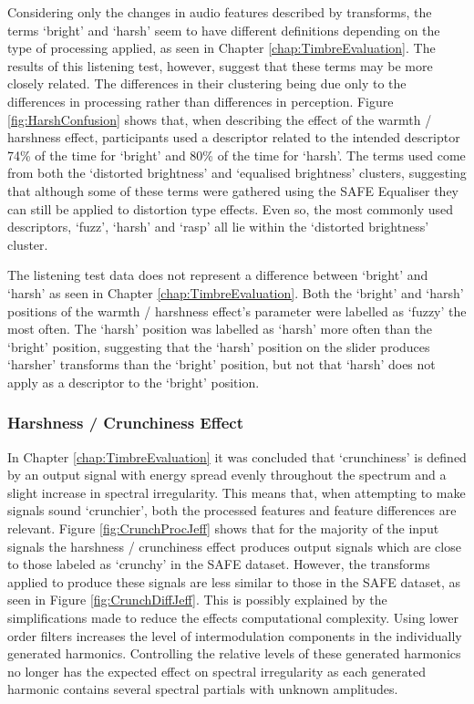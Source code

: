 			Considering only the changes in audio features described by transforms, the terms `bright' and
			`harsh' seem to have different definitions depending on the type of processing applied, as seen in
			Chapter \ref{chap:TimbreEvaluation}. The results of this listening test, however, suggest that
			these terms may be more closely related. The differences in their clustering being due only to the
			differences in processing rather than differences in perception. Figure \ref{fig:HarshConfusion}
			shows that, when describing the effect of the warmth / harshness effect, participants used a
			descriptor related to the intended descriptor 74\% of the time for `bright' and 80\% of the time
			for `harsh'. The terms used come from both the `distorted brightness' and `equalised brightness'
			clusters, suggesting that although some of these terms were gathered using the SAFE Equaliser they
			can still be applied to distortion type effects. Even so, the most commonly used descriptors,
			`fuzz', `harsh' and `rasp' all lie within the `distorted brightness' cluster.

			The listening test data does not represent a difference between `bright' and `harsh' as seen in
			Chapter \ref{chap:TimbreEvaluation}. Both the `bright' and `harsh' positions of the warmth /
			harshness effect's parameter were labelled as `fuzzy' the most often. The `harsh' position was
			labelled as `harsh' more often than the `bright' position, suggesting that the `harsh' position on
			the slider produces `harsher' transforms than the `bright' position, but not that `harsh' does not
			apply as a descriptor to the `bright' position.
			
		\subsubsection*{Harshness / Crunchiness Effect}
			In Chapter \ref{chap:TimbreEvaluation} it was concluded that `crunchiness' is defined by an output
			signal with energy spread evenly throughout the spectrum and a slight increase in spectral
			irregularity. This means that, when attempting to make signals sound `crunchier', both the
			processed features and feature differences are relevant.  Figure \ref{fig:CrunchProcJeff} shows
			that for the majority of the input signals the harshness / crunchiness effect produces output
			signals which are close to those labeled as `crunchy' in the SAFE dataset. However, the transforms
			applied to produce these signals are less similar to those in the SAFE dataset, as seen in Figure
			\ref{fig:CrunchDiffJeff}. This is possibly explained by the simplifications made to reduce the
			effects computational complexity. Using lower order filters increases the level of intermodulation
			components in the individually generated harmonics. Controlling the relative levels of these
			generated harmonics no longer has the expected effect on spectral irregularity as each generated
			harmonic contains several spectral partials with unknown amplitudes.

